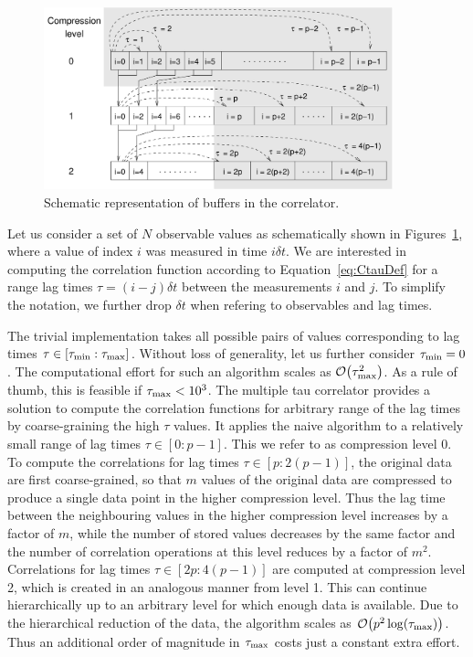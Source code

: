 \begin{figure}[ht]
\begin{center} 
\includegraphics[width=0.9\textwidth]{figures/correlator_scheme}
\end{center} 
\caption{Schematic representation of buffers in the correlator.}
\label{fig:dataSet}
\end{figure}

Let us consider a set of $N$ observable values as schematically shown
in Figures~\ref{fig:dataSet}, where a value of index $i$ was measured
in time $i\delta t$. We are interested in computing the correlation 
function according to Equation~\ref{eq:CtauDef} for a range lag times
$\tau = (i-j)\delta t$ between the measurements $i$ and $j$.
To simplify the notation, we further drop $\delta t$
when refering to observables and lag times. 

The trivial implementation takes all possible pairs of values
corresponding to lag times $\tau \in [\tau_{\mathrm{min}}:\tau_{\mathrm{max}}]$. 
Without loss of generality, let us further consider $\tau_{\mathrm{min}}=0$.
The computational effort for such an algorithm scales
as ${\cal O} \bigl(\tau_{\mathrm{max}}^2\bigr)$.
As a rule of thumb, this is feasible if $\tau_{\mathrm{max}} < 10^3$.
The multiple tau correlator provides a solution to compute the
correlation functions for arbitrary range of the lag times by
coarse-graining the high $\tau$ values. It applies the naive algorithm
to a relatively small range of lag times $\tau \in [0:p-1]$. This we refer
to as compression level 0. To compute the correlations for lag times
$\tau \in [p:2(p-1)]$, the original data are first coarse-grained, so
that $m$ values of the original data are compressed to produce a single
data point in the higher compression level. Thus the lag time between
the neighbouring values in the higher compression level increases
by a factor of $m$, while the number of stored values decreases by
the same factor and the number of correlation operations at this level
reduces by a factor of $m^2$. Correlations for lag times 
$\tau \in [2p:4(p-1)]$ are computed at compression level 2, which is created
in an analogous manner from level 1. This can continue hierarchically
up to an arbitrary level for which enough data is available. Due to the
hierarchical reduction of the data, the algorithm scales as 
${\cal O} \bigl( p^2 \log(\tau_{\mathrm{max}}) \bigr)$. Thus an additional order
of magnitude in $\tau_{\mathrm{max}}$ costs just a constant extra effort.

